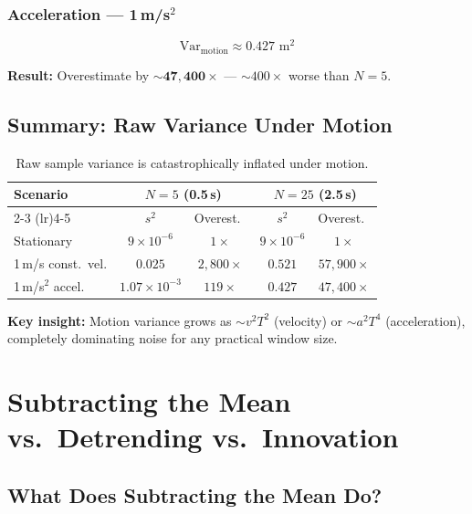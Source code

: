 \documentclass[11pt,a4paper]{article}
\begin{document}
\subsubsection{Acceleration --- 1\,m/s$^2$}

\begin{equation}
    \text{Var}_{\mathrm{motion}} \approx 0.427 \text{ m}^2
\end{equation}

\textbf{Result:} Overestimate by $\boldsymbol{\sim 47{,}400\times}$ --- $\sim 400\times$ worse than $N=5$.

\subsection{Summary: Raw Variance Under Motion}

\begin{table}[H]
\centering
\begin{tabular}{@{}lcccc@{}}
\toprule
\textbf{Scenario} & \multicolumn{2}{c}{\textbf{$N=5$ (0.5\,s)}} & \multicolumn{2}{c}{\textbf{$N=25$ (2.5\,s)}} \\
\cmidrule(lr){2-3} \cmidrule(lr){4-5}
 & $s^2$ & Overest.\ & $s^2$ & Overest.\ \\
\midrule
Stationary          & $9 \times 10^{-6}$ & $1\times$      & $9 \times 10^{-6}$ & $1\times$ \\
1\,m/s const.\ vel. & $0.025$            & $2{,}800\times$ & $0.521$            & $57{,}900\times$ \\
1\,m/s$^2$ accel.   & $1.07 \times 10^{-3}$ & $119\times$  & $0.427$            & $47{,}400\times$ \\
\bottomrule
\end{tabular}
\caption{Raw sample variance is catastrophically inflated under motion.}
\end{table}

\textbf{Key insight:} Motion variance grows as $\sim v^2 T^2$ (velocity) or $\sim a^2 T^4$ (acceleration), completely dominating noise for any practical window size.

\section{Subtracting the Mean vs.\ Detrending vs.\ Innovation}

\subsection{What Does Subtracting the Mean Do?}
\end{document}
